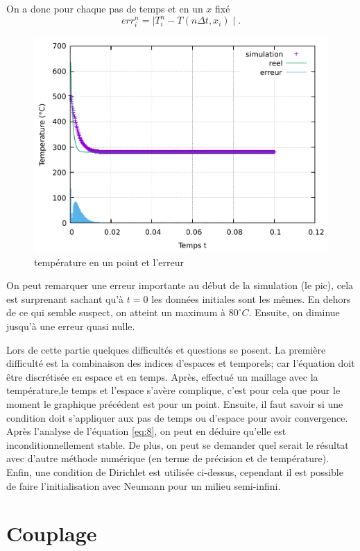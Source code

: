 \documentclass[a4paper,11pt]{article}
\begin{document}
On a donc pour chaque pas de temps et en un $x$ fixé 
$$ err_i^n = \mid T_i^n - T(n\Delta t, x_i) \mid. $$




\newpage

\begin{figure}
    \centering
    \includegraphics[width=0.9\linewidth]{images/Temperature_en_un_point.pdf}
    \caption{température en un point et l'erreur}
\end{figure}

On peut remarquer une erreur importante au début de la simulation (le pic), cela est surprenant sachant qu'à $t=0$ les données initiales sont les mêmes. En dehors de ce qui semble suspect, on atteint un maximum à $80^{\circ} C$. Ensuite, on diminue jusqu'à une erreur quasi nulle.


Lors de cette partie quelques difficultés et questions se posent. La première difficulté est la combinaison des indices d'espaces et temporels; car l'équation doit être discrétisée en espace et en temps. Après, effectué un maillage avec la température,le temps et l'espace s'avère complique, c'est pour cela que pour le moment le graphique précédent est pour un point. Ensuite, il faut savoir si une condition doit s'appliquer aux pas de temps ou d'espace pour avoir convergence. Après l'analyse de l'équation \eqref{eq:8}, on peut en déduire qu'elle est inconditionnellement stable. De plus, on peut se demander quel serait le résultat avec d'autre méthode numérique (en terme de précision et de température). Enfin, une condition de Dirichlet est utilisée ci-dessus, cependant il est possible de faire l'initialisation avec Neumann pour un milieu semi-infini.

\section{Couplage}
\end{document}
